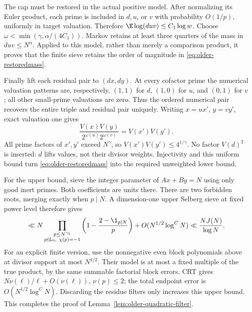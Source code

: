 The cap must be restored in the actual positive model.
After normalizing its Euler product, each prime is included in
\(d,u\), or \(v\) with probability \(O(1/p)\), uniformly in target
valuation.  Therefore
\(\E\log(duv)\le C_1\log w\).
Choose \(\omega<\min(\gamma,\alpha/(4C_1))\).
Markov retains at least three quarters of the mass in
\(duv\le N^\alpha\).  Applied to this model, rather than merely a
comparison product, it proves that the finite sieve retains the
order of magnitude in \eqref{eq:older-restoredmass}.

Finally lift each residual pair to \((dx,dy)\).
At every cofactor prime the numerical valuation patterns are,
respectively,
\((1,1)\) for \(d\), \((1,0)\) for \(u\), and \((0,1)\) for \(v\);
all other small-prime valuations are zero.
Thus the ordered numerical pair recovers the entire triple and
residual pair uniquely.
Writing \(x=ux'\), \(y=vy'\), exact valuation one gives
\[
       \frac{V(x)V(y)}{2^{\omega(u)}2^{\omega(v)}}
                                      =V(x')V(y').
\]
All prime factors of \(x',y'\) exceed \(N^\gamma\), so
\(V(x')V(y')\le4^{1/\gamma}\).
No factor \(V(d)^2\) is inserted: \(d\) lifts values, not their
divisor weights.
Injectivity and this uniform bound turn
\eqref{eq:older-restoredmass} into the required unweighted lower bound.

For the upper bound, sieve the integer parameter of \(Ax+By=N\)
using only good inert primes.  Both coefficients are units there.
There are two forbidden roots, merging exactly when \(p\mid N\).
A dimension-one upper Selberg sieve at fixed power level therefore
gives
\[
 \ll N\prod_{\substack{p\le N^{\gamma_1}\\
                       p\nmid L_0,\ \chi(p)=-1}}
       \left(1-\frac{2-\1_{p\mid N}}p\right)
            +O(N^{1/2}\log^C N)
 \ll \frac{NJ(N)}{\log N}.
\]
For an explicit finite version, use the nonnegative even block
polynomials above at divisor support at most \(N^{1/2}\).
Their model is at most a fixed multiple of the true product,
by the same summable factorial block errors.
CRT gives \(N\nu(\ell)/\ell+O(\nu(\ell))\), \(\nu(p)\le2\);
the total endpoint error is
\(O(N^{1/2}\log^C N)\).
Discarding the residue filters only increases this upper bound.
This completes the proof of Lemma~\ref{lem:older-quadratic-filter}.
